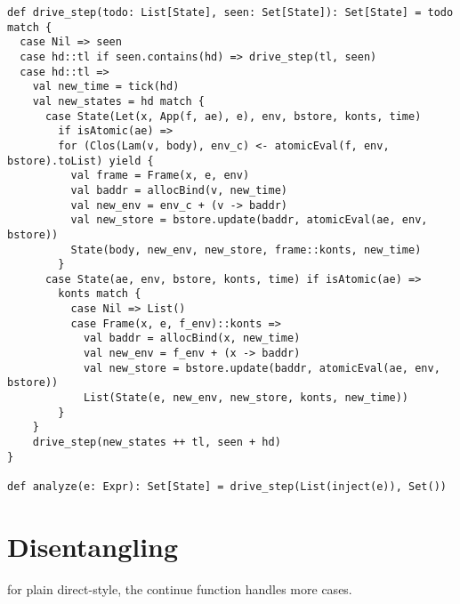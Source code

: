 \documentclass[acmsmall,review,anonymous]{acmart}\settopmatter{printfolios=true,printccs=false,printacmref=false}
\begin{document}
\begin{lstlisting}
def drive_step(todo: List[State], seen: Set[State]): Set[State] = todo match {
  case Nil => seen
  case hd::tl if seen.contains(hd) => drive_step(tl, seen)
  case hd::tl =>
    val new_time = tick(hd)
    val new_states = hd match {
      case State(Let(x, App(f, ae), e), env, bstore, konts, time) 
        if isAtomic(ae) =>
        for (Clos(Lam(v, body), env_c) <- atomicEval(f, env, bstore).toList) yield {
          val frame = Frame(x, e, env)
          val baddr = allocBind(v, new_time)
          val new_env = env_c + (v -> baddr)
          val new_store = bstore.update(baddr, atomicEval(ae, env, bstore))
          State(body, new_env, new_store, frame::konts, new_time)
        }
      case State(ae, env, bstore, konts, time) if isAtomic(ae) =>
        konts match {
          case Nil => List()
          case Frame(x, e, f_env)::konts =>
            val baddr = allocBind(x, new_time)
            val new_env = f_env + (x -> baddr)
            val new_store = bstore.update(baddr, atomicEval(ae, env, bstore))
            List(State(e, new_env, new_store, konts, new_time))
        }
    }
    drive_step(new_states ++ tl, seen + hd)
}

def analyze(e: Expr): Set[State] = drive_step(List(inject(e)), Set())
\end{lstlisting}

\section{Disentangling}

for plain direct-style, the continue function handles more cases.
\end{document}

